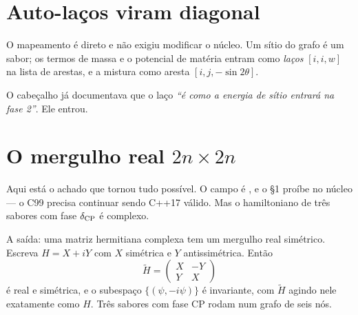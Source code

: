 \section{Auto-laços viram diagonal}

O mapeamento é direto e não exigiu modificar o núcleo. Um sítio do grafo é um
sabor; os termos de massa e o potencial de matéria entram como \emph{laços}
$[i,i,w]$ na lista de arestas, e a mistura como aresta $[i,j,-\sin 2\theta]$.

\begin{center}
\end{center}

O cabeçalho  já documentava que o laço \emph{``é como a
energia de sítio entrará na fase 2''}. Ele entrou.

\section{O mergulho real \texorpdfstring{$2n\times 2n$}{2n x 2n}}
\label{sec:mergulho}

Aqui está o achado que tornou tudo possível. O campo  é
, e o  §1 proíbe  no núcleo ---
o C99 precisa continuar sendo C++17 válido. Mas o hamiltoniano de três sabores
com fase $\delta_{\rm CP}$ é complexo.

A saída: uma matriz hermitiana complexa tem um mergulho real simétrico. Escreva
$H = X + iY$ com $X$ simétrica e $Y$ antissimétrica. Então
\begin{equation}
  \tilde H = \begin{pmatrix} X & -Y \\ Y & X \end{pmatrix}
\end{equation}
é real e simétrica, e o subespaço $\{(\psi, -i\psi)\}$ é invariante, com
$\tilde H$ agindo nele exatamente como $H$. Três sabores com fase CP rodam num
grafo de seis nós.

